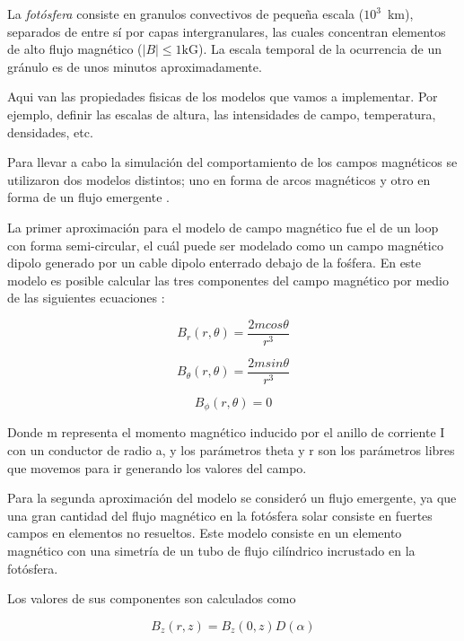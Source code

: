 \documentclass[9pt]{book}
\begin{document}
La \emph{fot\'osfera}  consiste en granulos convectivos de peque\~na escala ($10^3$~km), separados de entre s\'i por capas intergranulares, las cuales concentran elementos de alto flujo magn\'etico ($|B| \le 1\mbox{kG}$). La escala temporal de la ocurrencia de un gr\'anulo es de unos minutos aproximadamente.



Aqui van las propiedades fisicas de los modelos que vamos a implementar. Por ejemplo, definir las escalas de altura, las intensidades de campo, temperatura, densidades, etc.

Para llevar a cabo la simulaci\'on del comportamiento de los campos magn\'eticos se utilizaron dos modelos distintos; uno en forma de arcos magn\'eticos \cite{loops} y otro en forma de un flujo emergente \cite{flujoemergente}.

La primer aproximaci\'on para el modelo de campo magn\'etico fue el de un loop con forma semi-circular, el cu\'al puede ser modelado como un campo magn\'etico dipolo generado por un cable dipolo enterrado debajo de la fo\'sfera.
En este modelo es posible calcular las tres componentes del campo magn\'etico por medio de las siguientes ecuaciones :

\begin{equation}
    B_r(r,\theta)=\frac{2mcos\theta}{r^3}
\end{equation}
  
\begin{equation}
    B_\theta(r,\theta)=\frac{2msin\theta}{r^3}
\end{equation}

\begin{equation}
    B_\phi(r,\theta)=0
\end{equation}

Donde m representa el momento magn\'etico inducido por el anillo de corriente I con un conductor de radio a, y los par\'ametros theta y r son los par\'ametros libres que movemos para ir generando los valores del campo.

Para la segunda aproximaci\'on del modelo se consider\'o un flujo emergente, ya que una gran cantidad del flujo magn\'etico en la fot\'osfera solar consiste en fuertes campos en elementos no resueltos. Este modelo consiste en un elemento magn\'etico con una simetr\'ia de un tubo de flujo cil\'indrico incrustado en la fot\'osfera.

Los valores de sus componentes son calculados como

\begin{equation}
B_z(r,z)=B_z(0,z)D(\alpha)
\end{equation}
\end{document}
